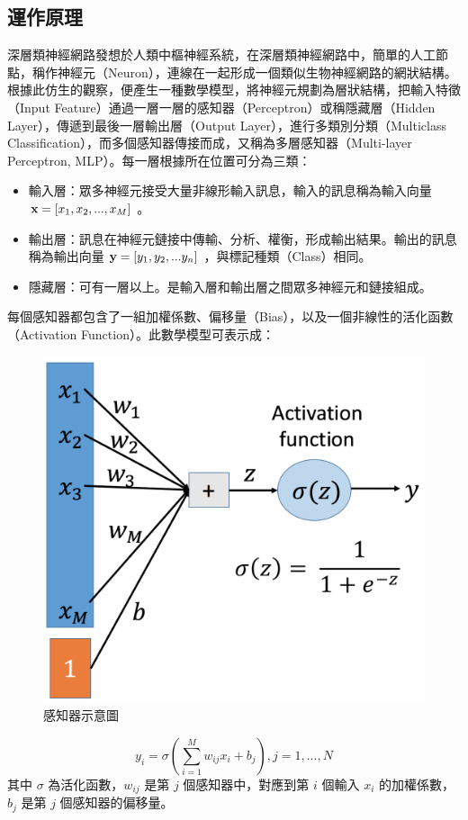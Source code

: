 \subsection{運作原理}
深層類神經網路發想於人類中樞神經系統，在深層類神經網路中，簡單的人工節點，稱作神經元（Neuron），連線在一起形成一個類似生物神經網路的網狀結構。根據此仿生的觀察，便產生一種數學模型，將神經元規劃為層狀結構，把輸入特徵（Input Feature）通過一層一層的感知器（Perceptron）或稱隱藏層（Hidden Layer），傳遞到最後一層輸出層（Output Layer），進行多類別分類（Multiclass Classification），而多個感知器傳接而成，又稱為多層感知器（Multi-layer Perceptron, MLP）。每一層根據所在位置可分為三類：
\begin{itemize}
    \item 輸入層：眾多神經元接受大量非線形輸入訊息，輸入的訊息稱為輸入向量 $\bold{x} = [x_1,x_2, ... , x_M]$ 。
    \item 輸出層：訊息在神經元鏈接中傳輸、分析、權衡，形成輸出結果。輸出的訊息稱為輸出向量 $\bold{y} = [y_1,y_2,...y_n]$ ，與標記種類（Class）相同。
    \item 隱藏層：可有一層以上。是輸入層和輸出層之間眾多神經元和鏈接組成。
\end{itemize}
每個感知器都包含了一組加權係數、偏移量（Bias），以及一個非線性的活化函數（Activation Function）。此數學模型可表示成：
\begin{figure}[h]
    \centering
    \includegraphics[scale=0.4]{images/chap2_perceptron.png}
    \caption{感知器示意圖}
\end{figure}
\begin{equation}
    y_i = \sigma{(\sum_{i=1}^M w_{ij}x_i+b_j)} ,  j= 1,...,N
\end{equation}
其中 $\sigma$ 為活化函數，$w_{ij}$ 是第 $j$ 個感知器中，對應到第 $i$ 個輸入 $x_i$ 的加權係數，$b_j$ 是第 $j$ 個感知器的偏移量。


